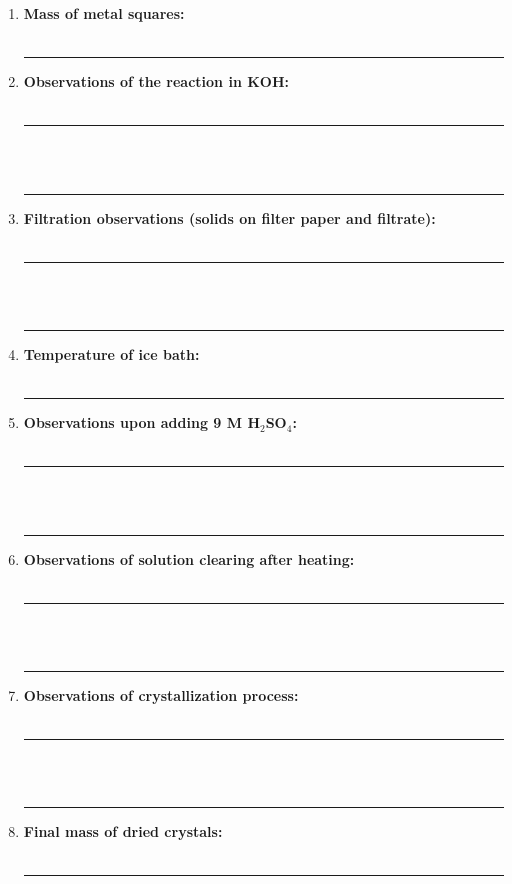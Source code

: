 \documentclass{report}
\begin{document}
\begin{enumerate}
    \item \textbf{Mass of metal squares:} 
	\\
    \\
    \rule{15cm}{0.4pt} %
    
    \item \textbf{Observations of the reaction in KOH:} \\
	\\
	\rule{15cm}{0.4pt} %
	\\
	\\
	\rule{15cm}{0.4pt} %
    
    \item \textbf{Filtration observations (solids on filter paper and filtrate):} \\
	\\
	\rule{15cm}{0.4pt} %
	\\
	\\
	\rule{15cm}{0.4pt} %
    
    \item \textbf{Temperature of ice bath:} \\
	\\
	\rule{15cm}{0.4pt} %
    
    \item \textbf{Observations upon adding 9 M H$_2$SO$_4$:} \\
	\\
	\rule{15cm}{0.4pt} %
	\\
	\\
	\rule{15cm}{0.4pt} %
    
    \item \textbf{Observations of solution clearing after heating:} \\
	\\
	\rule{15cm}{0.4pt} %
	\\
	\\
	\rule{15cm}{0.4pt} %
    
    \item \textbf{Observations of crystallization process:} \\
	\\
	\rule{15cm}{0.4pt} %
	\\
	\\
	\rule{15cm}{0.4pt} %
    
    \item \textbf{Final mass of dried crystals:} \\
	\\
	\rule{15cm}{0.4pt} %
\end{enumerate}
\end{document}
